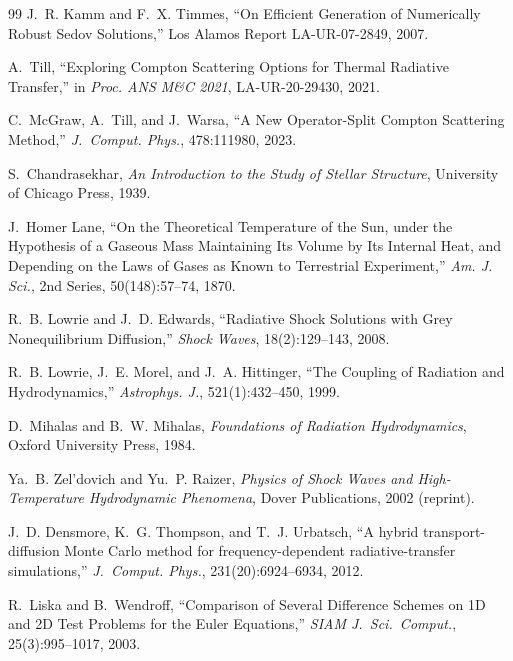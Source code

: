 \documentclass[11pt,a4paper]{article}
\begin{document}
\begin{thebibliography}{99}
J.~R. Kamm and F.~X. Timmes,
``On Efficient Generation of Numerically Robust Sedov Solutions,''
Los Alamos Report LA-UR-07-2849, 2007.


A.~Till,
``Exploring Compton Scattering Options for Thermal Radiative Transfer,''
in \textit{Proc. ANS M\&C 2021}, LA-UR-20-29430, 2021.

C.~McGraw, A.~Till, and J.~Warsa,
``A New Operator-Split Compton Scattering Method,''
\textit{J.~Comput. Phys.}, 478:111980, 2023.


S.~Chandrasekhar,
\textit{An Introduction to the Study of Stellar Structure},
University of Chicago Press, 1939.

J.~Homer Lane,
``On the Theoretical Temperature of the Sun, under the Hypothesis of a Gaseous
Mass Maintaining Its Volume by Its Internal Heat, and Depending on the Laws of
Gases as Known to Terrestrial Experiment,''
\textit{Am. J. Sci.}, 2nd Series, 50(148):57--74, 1870.


R.~B. Lowrie and J.~D. Edwards,
``Radiative Shock Solutions with Grey Nonequilibrium Diffusion,''
\textit{Shock Waves}, 18(2):129--143, 2008.

R.~B. Lowrie, J.~E. Morel, and J.~A. Hittinger,
``The Coupling of Radiation and Hydrodynamics,''
\textit{Astrophys. J.}, 521(1):432--450, 1999.

D.~Mihalas and B.~W. Mihalas,
\textit{Foundations of Radiation Hydrodynamics},
Oxford University Press, 1984.

Ya.~B. Zel'dovich and Yu.~P. Raizer,
\textit{Physics of Shock Waves and High-Temperature Hydrodynamic Phenomena},
Dover Publications, 2002 (reprint).


J.~D. Densmore, K.~G. Thompson, and T.~J. Urbatsch,
``A hybrid transport-diffusion Monte Carlo method for frequency-dependent
radiative-transfer simulations,''
\textit{J.~Comput. Phys.}, 231(20):6924--6934, 2012.


R.~Liska and B.~Wendroff,
``Comparison of Several Difference Schemes on 1D and 2D Test Problems for the
Euler Equations,''
\textit{SIAM J.~Sci.~Comput.}, 25(3):995--1017, 2003.


\end{thebibliography}
\end{document}
